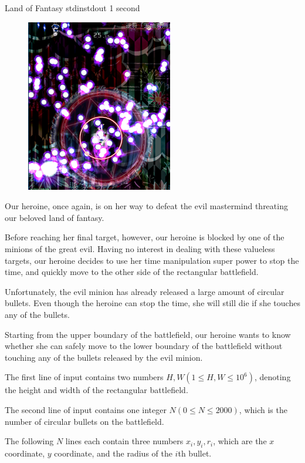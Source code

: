 \begin{problem}{Land of Fantasy}
{stdin}{stdout}
{1 second}{}{}

\begin{figure}
    \includegraphics[scale=0.8]{danmaku.png}
\end{figure}
Our heroine, once again, is on her way to defeat the evil mastermind threating 
our beloved land of fantasy. 


Before reaching her final target, however, our heroine is blocked by one of
the minions of the great evil. Having no interest in dealing with these
valueless targets, our heroine decides to use her time manipulation super power
to stop the time, and quickly move to the other side of the 
rectangular battlefield.

Unfortunately, the evil minion has already released a large amount of circular 
bullets. Even though the heroine can stop the time, she will still die if she 
touches any of the bullets.

Starting from the upper boundary of the battlefield, our heroine wants to
know whether she can safely move to the lower boundary of the battlefield
without touching any of the bullets released by the evil minion.

\InputFile

The first line of input contains two numbers $H, W (1 \le H, W \le 10^6)$,
denoting the height and width of the rectangular battlefield.

The second line of input contains one integer $N (0 \le N \le 2000)$, which
is the number of circular bullets on the battlefield.

The following $N$ lines each contain three numbers $x_i, y_i, r_i$, which are 
the $x$ coordinate, $y$ coordinate, and the radius of the $i$th bullet.


\end{problem}
